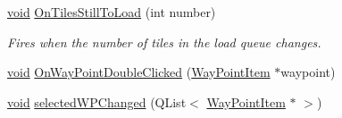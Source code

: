 \begin{DoxyCompactItemize}
\hyperlink{group___u_a_v_objects_plugin_ga444cf2ff3f0ecbe028adce838d373f5c}{void} \hyperlink{group___o_p_map_widget_gad7537ed2e10658cabe5f1f320f31b83f}{\-On\-Tiles\-Still\-To\-Load} (int number)
\begin{DoxyCompactList}\small\item\em \-Fires when the number of tiles in the load queue changes. \end{DoxyCompactList}\item 
\hyperlink{group___u_a_v_objects_plugin_ga444cf2ff3f0ecbe028adce838d373f5c}{void} \hyperlink{group___o_p_map_widget_ga76257e275a9d3c05a75b0fca87faba3d}{\-On\-Way\-Point\-Double\-Clicked} (\hyperlink{classmapcontrol_1_1_way_point_item}{\-Way\-Point\-Item} $\ast$waypoint)
\item 
\hyperlink{group___u_a_v_objects_plugin_ga444cf2ff3f0ecbe028adce838d373f5c}{void} \hyperlink{group___o_p_map_widget_ga173f22c1dd41ac235400d05eb42eeff6}{selected\-W\-P\-Changed} (\-Q\-List$<$ \hyperlink{classmapcontrol_1_1_way_point_item}{\-Way\-Point\-Item} $\ast$ $>$)
\end{DoxyCompactItemize}
